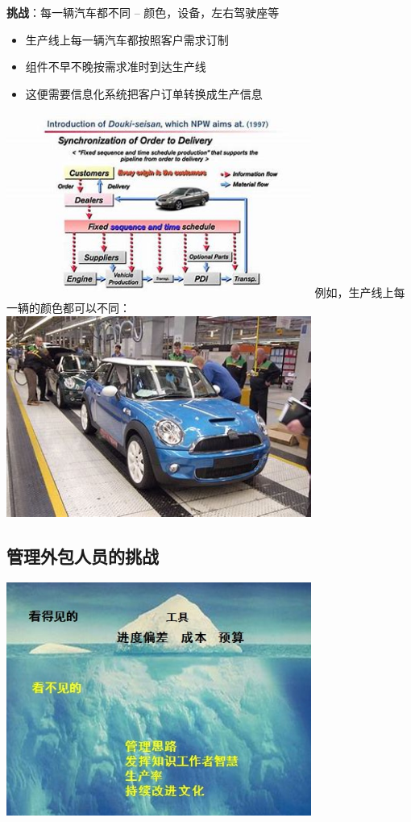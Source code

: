 \textbf{挑战}：每一辆汽车都不同 -- 颜色，设备，左右驾驶座等

\begin{itemize}
\tightlist
\item
  生产线上每一辆汽车都按照客户需求订制
\item
  组件不早不晚按需求准时到达生产线
\item
  这便需要信息化系统把客户订单转换成生产信息
\end{itemize}


\includegraphics[width=10cm]{NissanJIT_OIP_RQGKy67DWGTu-DQiOCqW2gHaEK.jpg}
例如，生产线上每一辆的颜色都可以不同：\\

\includegraphics[width=10cm]{NissanProdLineOIP_wJFmfMl7q2_V8JaQi4kQ8QHaE6.jpg}\\


\hypertarget{ux7ba1ux7406ux5916ux5305ux4ebaux5458ux7684ux6311ux6218}{%
\subsection{管理外包人员的挑战}\label{ux7ba1ux7406ux5916ux5305ux4ebaux5458ux7684ux6311ux6218}}



\includegraphics[width=10cm]{冰山.jpg}

